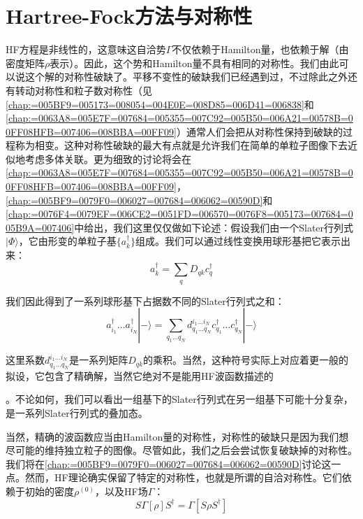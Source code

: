 \section{Hartree-Fock方法与对称性\label{sec:Hartree-Fock=0065B9=006CD5=004E0E=005BF9=0079F0=006027}}

HF方程是非线性的，这意味这自洽势$\Gamma$不仅依赖于Hamilton量，也依赖于解（由密度矩阵$\rho$表示）。因此，这个势和Hamilton量不具有相同的对称性。我们由此可以说这个解的对称性破缺了。平移不变性的破缺我们已经遇到过，不过除此之外还有转动对称性和粒子数对称性（见\ref{chap:=005BF9=005173=008054=004E0E=008D85=006D41=006838}和\ref{chap:=0063A8=005E7F=007684=005355=007C92=005B50=006A21=00578B=00FF08HFB=007406=008BBA=00FF09}）通常人们会把从对称性保持到破缺的过程称为相变。这种对称性破缺的最大有点就是允许我们在简单的单粒子图像下去近似地考虑多体关联。更为细致的讨论将会在\ref{chap:=0063A8=005E7F=007684=005355=007C92=005B50=006A21=00578B=00FF08HFB=007406=008BBA=00FF09}，\ref{chap:=005BF9=0079F0=006027=007684=006062=00590D}和\ref{chap:=0076F4=0079EF=006CE2=0051FD=006570=0076F8=005173=007684=005B9A=007406}中给出，我们这里仅仅做如下论述：假设我们由一个Slater行列式$|\Phi\rangle$，它由形变的单粒子基$\{a^{\dagger}_{k}\}$组成。我们可以通过线性变换用球形基把它表示出来：
\[
a^{\dagger}_{k}=\sum_{q}D_{qk}c^{\dagger}_{q}
\]

我们因此得到了一系列球形基下占据数不同的Slater行列式之和：
\[
a^{\dagger}_{i_{1}}\dots a^{\dagger}_{i_{N}}|-\rangle=\sum_{q_{1}\dots q_{N}}d^{i_{1}\dots i_{N}}_{q_{1}\dots q_{N}}c^{\dagger}_{q_{1}}\dots c^{\dagger}_{q_{N}}|-\rangle
\]

这里系数$d^{i_{1}\dots i_{N}}_{q_{1}\dots q_{N}}$是一系列矩阵$D_{qk}$的乘积。当然，这种符号实际上对应着更一般的拟设，它包含了精确解，当然它绝对不是能用HF波函数描述的

。不论如何，我们可以看出一组基下的Slater行列式在另一组基下可能十分复杂，是一系列Slater行列式的叠加态。

当然，精确的波函数应当由Hamilton量的对称性，对称性的破缺只是因为我们想尽可能的维持独立粒子的图像。尽管如此，我们之后会尝试恢复破缺掉的对称性。我们将在\ref{chap:=005BF9=0079F0=006027=007684=006062=00590D}讨论这一点。然而，HF理论确实保留了特定的对称性，也就是所谓的自洽对称性。它们依赖于初始的密度$\rho^{(0)}$，以及HF场$\Gamma$：
\begin{equation}
S\Gamma[\rho]S^{\dagger}=\Gamma[S\rho S^{\dagger}]\label{eq:self-consistence sysmmetry}
\end{equation}

